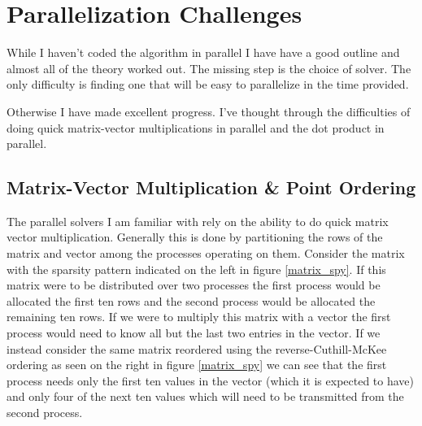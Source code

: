 \documentclass[12pt]{article}
\begin{document}
	
\section{Parallelization Challenges}
	While I haven't coded the algorithm in parallel I have have a good outline and almost all of the theory worked out. The missing step is the choice of solver. The only difficulty is finding one that will be easy to parallelize in the time provided. 
	
	Otherwise I have made excellent progress. I've thought through the difficulties of doing quick matrix-vector multiplications in parallel and the dot product in parallel. 
	
\subsection{Matrix-Vector Multiplication \& Point Ordering}
	The parallel solvers I am familiar with rely on the ability to do quick matrix vector multiplication. Generally this is done by partitioning the rows of the matrix and vector among the processes operating on them. Consider the matrix with the sparsity pattern indicated on the left in figure \ref{matrix_spy}. If this matrix were to be distributed over two processes the first process would be allocated the first ten rows and the second process would be allocated the remaining ten rows. If we were to multiply this matrix with a vector the first process would need to know all but the last two entries in the vector. If we instead consider the same matrix reordered using the reverse-Cuthill-McKee ordering as seen on the right in figure \ref{matrix_spy} we can see that the first process needs only the first ten values in the vector (which it is expected to have) and only four of the next ten values which will need to be transmitted from the second process.
	
\end{document}
